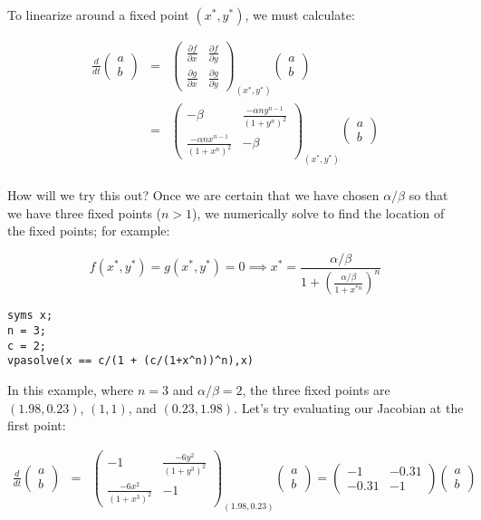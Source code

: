\documentclass{article}
\begin{document}
To linearize around a fixed point $(x^*,y^*)$, we must calculate:

\begin{eqnarray*}
\frac{d}{dt} \begin{pmatrix} a \\ b \end{pmatrix} & = &  \begin{pmatrix} \frac{\partial f}{\partial x} & \frac{\partial f}{\partial y}\\  \frac{\partial g}{\partial x} & \frac{\partial g}{\partial y} \end{pmatrix}_{(x^*, y^*)} \begin{pmatrix} a \\ b \end{pmatrix}\\
& = & \begin{pmatrix} - \beta  &  \frac{-\alpha ny^{n-1}}{(1+y^n)^2} \\   \frac{- \alpha nx^{n-1}}{(1+x^n)^2} & -\beta  \end{pmatrix}_{(x^*, y^*)} \begin{pmatrix} a \\ b \end{pmatrix}\\
\end{eqnarray*}

How will we try this out? Once we are certain that we have chosen $\alpha/\beta$ so that we have three fixed points ($n>1$), we numerically solve to find the location of the fixed points; for example:

\[f(x^*,y^*) = g(x^*, y^*) = 0 \implies x^* = \frac{\alpha/\beta}{1 + \left( \frac{\alpha/\beta}{1 + x^{*n}} \right)^n} \]

\begin{lstlisting}
syms x;
n = 3;
c = 2;
vpasolve(x == c/(1 + (c/(1+x^n))^n),x)
\end{lstlisting}

In this example, where $n=3$ and $\alpha/\beta = 2$, the three fixed points are $(1.98, 0.23)$, $(1,1)$, and $(0.23, 1.98)$. Let's try evaluating our Jacobian at the first point:

\begin{eqnarray*}
\frac{d}{dt} \begin{pmatrix} a \\ b \end{pmatrix} & = & \begin{pmatrix} -1 & \frac{- 6 y^{2}}{(1+y^{3})^2} \\ \frac{- 6 x^{2}}{(1+x^{3})^2} & -1  \end{pmatrix}_{(1.98, 0.23)} \begin{pmatrix} a \\ b \end{pmatrix} = \begin{pmatrix} -1 & -0.31 \\ -0.31 & -1 \end{pmatrix} \begin{pmatrix} a \\ b \end{pmatrix}\\
\end{eqnarray*}
\end{document}
